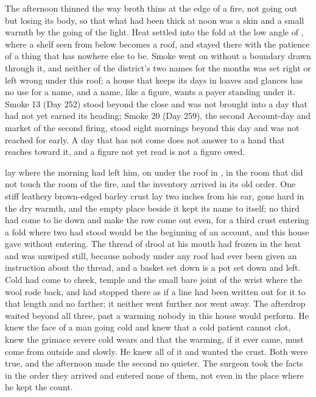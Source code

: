 The afternoon thinned the way broth thins at the edge of a fire, not going out but losing its body, so that what had been thick at noon was a skin and a small warmth by the going of the light. Heat settled into the fold at the low angle of , where a shelf seen from below becomes a roof, and stayed there with the patience of a thing that has nowhere else to be. Smoke went on without a boundary drawn through it, and neither of the district's two names for the months was set right or left wrong under this roof; a house that keeps its days in loaves and glances has no use for a name, and a name, like a figure, wants a payer standing under it. Smoke 13 (Day 252) stood beyond the close and was not brought into a day that had not yet earned its heading; Smoke 20 (Day 259), the second Account-day and market of the second firing, stood eight mornings beyond this day and was not reached for early. A day that has not come does not answer to a hand that reaches toward it, and a figure not yet read is not a figure owed.

 lay where the morning had left him, on  under the roof in , in the room that did not touch the room of the fire, and the inventory arrived in its old order. One stiff leathery brown-edged barley crust lay two inches from his ear, gone hard in the dry warmth, and the empty place beside it kept its name to itself; no third had come to lie down and make the row come out even, for a third crust entering a fold where two had stood would be the beginning of an account, and this house gave without entering. The thread of drool at his mouth had frozen in the heat and was unwiped still, because nobody under any roof had ever been given an instruction about the thread, and a basket set down is a pot set down and left. Cold had come to cheek, temple and the small bare joint of the wrist where the wool rode back, and had stopped there as if a line had been written out for it to that length and no farther; it neither went further nor went away. The afterdrop waited beyond all three, past a warming nobody in this house would perform. He knew the face of a man going cold and knew that a cold patient cannot clot, knew the grimace severe cold wears and that the warming, if it ever came, must come from outside and slowly. He knew all of it and wanted the crust. Both were true, and the afternoon made the second no quieter. The surgeon took the facts in the order they arrived and entered none of them, not even in the place where he kept the count.

